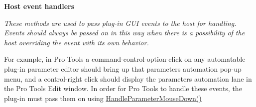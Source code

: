 \begin{Indent}\textbf{ Host event handlers}\par
{\em These methods are used to pass plug-\/in G\+UI events to the host for handling. Events should always be passed on in this way when there is a possibility of the host overriding the event with its own behavior.

For example, in Pro Tools a command-\/control-\/option-\/click on any automatable plug-\/in parameter editor should bring up that parameter\textquotesingle{}s automation pop-\/up menu, and a control-\/right click should display the parameter\textquotesingle{}s automation lane in the Pro Tools Edit window. In order for Pro Tools to handle these events, the plug-\/in must pass them on using \mbox{\hyperlink{a01889_a75bdb733456034a6dde5eea2043569d4}{Handle\+Parameter\+Mouse\+Down()}}

}
\end{Indent}
